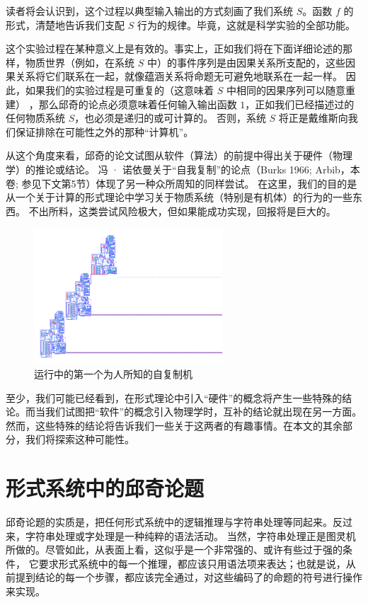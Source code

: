 \documentclass[a4paper,12pt]{article}
\begin{document}
读者将会认识到，这个过程以典型输入输出的方式刻画了我们系统 $S$。函数 $f$ 的形式，清楚地告诉我们支配 $S$ 行为的规律。毕竟，这就是科学实验的全部功能。

这个实验过程在某种意义上是有效的。事实上，正如我们将在下面详细论述的那样，物质世界（例如，在系统 $S$ 中）的事件序列是由因果关系所支配的，这些因果关系将它们联系在一起，就像蕴涵关系将命题无可避免地联系在一起一样。
因此，如果我们的实验过程是可重复的（这意味着 $S$ 中相同的因果序列可以随意重建） ，那么邱奇的论点必须意味着任何输入输出函数 $1$，正如我们已经描述过的任何物质系统 $S$，也必须是递归的或可计算的。
否则，系统 $S$ 将正是戴维斯向我们保证排除在可能性之外的那种“计算机”。

从这个角度来看，邱奇的论文试图从软件（算法）的前提中得出关于硬件（物理学）的推论或结论。
冯 · 诺依曼关于“自我复制”的论点（Burks 1966; Arbib，本卷; 参见下文第5节）体现了另一种众所周知的同样尝试。
在这里，我们的目的是从一个关于计算的形式理论中学习关于物质系统（特别是有机体）的行为的一些东西。
不出所料，这类尝试风险极大，但如果能成功实现，回报将是巨大的。

\begin{figure}[ht]
\centering
\includegraphics[height=2.0in]{images/self_reprod.png}
\caption{运行中的第一个为人所知的自复制机}
\end{figure}

至少，我们可能已经看到，在形式理论中引入“硬件”的概念将产生一些特殊的结论。而当我们试图把“软件”的概念引入物理学时，互补的结论就出现在另一方面。
然而，这些特殊的结论将告诉我们一些关于这两者的有趣事情。在本文的其余部分，我们将探索这种可能性。

\section{形式系统中的邱奇论题}

邱奇论题的实质是，把任何形式系统中的逻辑推理与字符串处理等同起来。反过来，字符串处理或字处理是一种纯粹的语法活动。
当然，字符串处理正是图灵机所做的。尽管如此，从表面上看，这似乎是一个非常强的、或许有些过于强的条件，
它要求形式系统中的每一个推理，都应该只用语法项来表达；也就是说，从前提到结论的每一个步骤，都应该完全通过，对这些编码了的命题的符号进行操作来实现。
\end{document}
